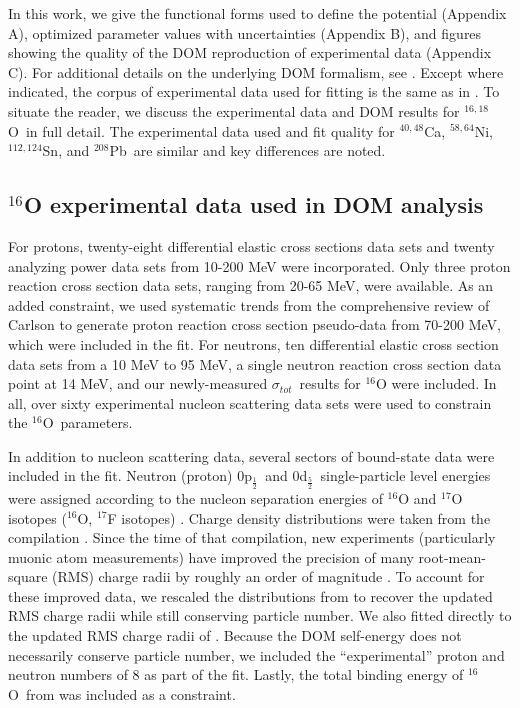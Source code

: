 \documentclass[twocolumn,secnumarabic,amssymb, nobibnotes, aps, prl,
superscriptaddress, nobalancelastpage]{revtex4}
\newcommand{\tot}{\ensuremath{\sigma_{tot}}}
\newcommand{\oSix}{\ensuremath{^{16}}O}
\newcommand{\oSixEight}{\ensuremath{^{16,18}}O}
\newcommand{\caAughtEight}{\ensuremath{^{40,48}}C\lowercase{a}}
\newcommand{\niEightFour}{\ensuremath{^{58,64}}N\lowercase{i}}
\newcommand{\snTwelveFour}{\ensuremath{^{112,124}}S\lowercase{n}}
\newcommand{\pbEight}{\ensuremath{^{208}}P\lowercase{b}}
\newcommand{\pOne}{p\ensuremath{_{\frac{1}{2}}}}
\newcommand{\dFive}{d\ensuremath{_{\frac{5}{2}}}}
\begin{document}
In this work, we give the functional forms used to define the
potential (Appendix A), optimized parameter values with uncertainties (Appendix B),
and figures showing the quality of the DOM reproduction of experimental data (Appendix
C). For additional details on the underlying DOM formalism, see \cite{Mahaux1991,
Dickhoff2018}. Except where indicated, the corpus of experimental data used for
fitting is the same as in \cite{PruittPhDThesis}. To situate the reader, we discuss the
experimental data and DOM results for \oSixEight\ in full detail. The
experimental data used and fit quality for \caAughtEight, \niEightFour,
\snTwelveFour, and \pbEight\ are similar and key differences are noted.

\subsection{$^{16}$O experimental data used in DOM analysis}
For protons, twenty-eight differential elastic cross
sections data sets and twenty analyzing power data sets from 10-200 MeV were
incorporated. Only three proton reaction cross section data sets, ranging from 20-65 MeV,
were available. As an added constraint, we used systematic trends
from the comprehensive review of Carlson \cite{Carlson1996} to generate proton
reaction cross section pseudo-data from 70-200 MeV, which were included in the fit.
For neutrons, ten differential elastic cross section
data sets from a 10 MeV to 95 MeV, a single
neutron reaction cross section data point at 14 MeV, and our newly-measured \tot\ results
for $^{16}$O were included. In all, over sixty experimental nucleon scattering
data sets were used to constrain the \oSix\ parameters.

In addition to nucleon scattering data, several sectors of bound-state data were
included in the fit. Neutron (proton) 0\pOne\ and 0\dFive\
single-particle level energies were
assigned according to the nucleon separation energies of $^{16}$O and
$^{17}$O isotopes ($^{16}$O, $^{17}$F isotopes) \cite{AME2016}.
Charge density distributions were taken from the compilation \cite{DeVries1987}.
Since the time of that compilation,
new experiments (particularly muonic atom measurements) have improved the precision
of many root-mean-square (RMS) charge radii by roughly an order of magnitude \cite{Angeli2013}.
To account for these improved data, we rescaled the distributions from
\cite{DeVries1987} to recover the updated
RMS charge radii while still conserving particle number. We also fitted directly
to the updated RMS charge radii of \cite{Angeli2013}.
Because the DOM self-energy does not necessarily conserve particle number, we
included the ``experimental'' proton and neutron numbers of 8 as part of the
fit. Lastly, the total binding energy of \oSix\ from \cite{AME2016} was
included as a constraint. 
\end{document}
